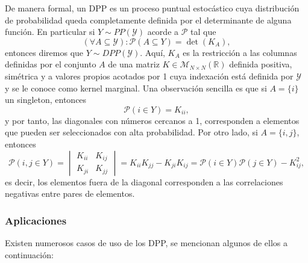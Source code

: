 De manera formal, un DPP es un proceso puntual estocástico cuya distribución de probabilidad queda completamente definida por el determinante de alguna función. En particular si $Y \sim PP(\mathcal{Y})$ acorde a $\mathcal{P}$ tal que 
\[ (\forall A \subseteq \mathcal{Y}): \mathcal{P}(A \subseteq Y) = \det(K_A) ,  \]
entonces diremos que $Y \sim DPP(\mathcal{Y})$. Aquí, $K_A$ es la restricción a las columnas definidas por el conjunto $A$ de una matriz $K \in \mathcal{M}_{N \times N} (\mathbb{R})$ definida positiva, simétrica y a valores propios acotados por 1 cuya indexación está definida por $\mathcal{Y}$ y se le conoce como kernel marginal. Una observación sencilla es que si $A = \{i\}$ un singleton, entonces 
\[ \mathcal{P}(i \in Y) = K_{ii} ,  \]
y por tanto, las diagonales con números cercanos a 1, corresponden a elementos que pueden ser seleccionados con alta probabilidad. Por otro lado, si $A = \{i,j\}$, entonces
	\[
	\mathcal{P}(i,j \in Y) = \begin{vmatrix}
    K_{ii} & K_{ij} \\ 
    K_{ji} & K_{jj}
    \end{vmatrix} = K_{ii}K_{jj} - K_{ji}K_{ij} = \mathcal{P}(i \in Y)\mathcal{P}(j \in Y) - K_{ij}^2 , 
	\] 
es decir, los elementos fuera de la diagonal corresponden a las correlaciones negativas entre pares de elementos.

\subsubsection{Aplicaciones }

Existen numerosos casos de uso de los DPP, se mencionan algunos de ellos a continuación: 

